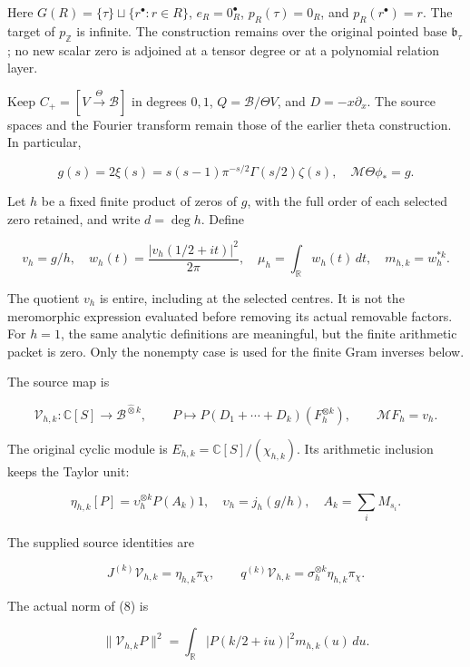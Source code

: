 \documentclass[11pt,a4paper]{article}
\begin{document}
Here \(G(R)=\{\tau\}\sqcup\{r^\bullet:r\in R\}\), \(e_R=0_R^\bullet\), \(p_R(\tau)=0_R\), and \(p_R(r^\bullet)=r\). The target of \(p_{\mathbb Z}\) is infinite. The construction remains over the original pointed base \(\mathfrak b_\tau\); no new scalar zero is adjoined at a tensor degree or at a polynomial relation layer.

Keep \(C_+=[V\xrightarrow{\Theta}\mathscr B]\) in degrees \(0,1\), \(Q=\mathscr B/\Theta V\), and \(D=-x\partial_x\). The source spaces and the Fourier transform remain those of the earlier theta construction. In particular,

\[
 g(s)=2\xi(s)=s(s-1)\pi^{-s/2}\Gamma(s/2)\zeta(s),\quad
 \mathcal M\Theta\phi_*=g.                                            \tag{6}
\]

Let \(h\) be a fixed finite product of zeros of \(g\), with the full order of each selected zero retained, and write \(d=\deg h\). Define

\[
 v_h=g/h,\quad
 w_h(t)=\frac{|v_h(1/2+it)|^2}{2\pi},\quad
 \mu_h=\int_{\mathbb R}w_h(t)\,dt,\quad m_{h,k}=w_h^{*k}.               \tag{7}
\]

The quotient \(v_h\) is entire, including at the selected centres. It is not the meromorphic expression evaluated before removing its actual removable factors. For \(h=1\), the same analytic definitions are meaningful, but the finite arithmetic packet is zero. Only the nonempty case is used for the finite Gram inverses below.

The source map is

\[
 \mathcal V_{h,k}:\mathbb C[S]\longrightarrow\mathscr B^{\widehat\otimes k},
 \qquad P\longmapsto P(D_1+\cdots+D_k)(F_h^{\otimes k}),\qquad
 \mathcal MF_h=v_h.                                                    \tag{8}
\]

The original cyclic module is \(E_{h,k}=\mathbb C[S]/(\chi_{h,k})\). Its arithmetic inclusion keeps the Taylor unit:

\[
 \eta_{h,k}[P]=\upsilon_h^{\otimes k}P(A_k)1,\quad
 \upsilon_h=j_h(g/h),\quad A_k=\sum_iM_{s_i}.                           \tag{9}
\]

The supplied source identities are

\[
 J^{(k)}\mathcal V_{h,k}=\eta_{h,k}\pi_\chi,\qquad
 q^{(k)}\mathcal V_{h,k}=\sigma_h^{\otimes k}\eta_{h,k}\pi_\chi.          \tag{10}
\]

The actual norm of (8) is

\[
 \|\mathcal V_{h,k}P\|^2
 =\int_{\mathbb R}|P(k/2+iu)|^2m_{h,k}(u)\,du.                          \tag{11}
\]
\end{document}
